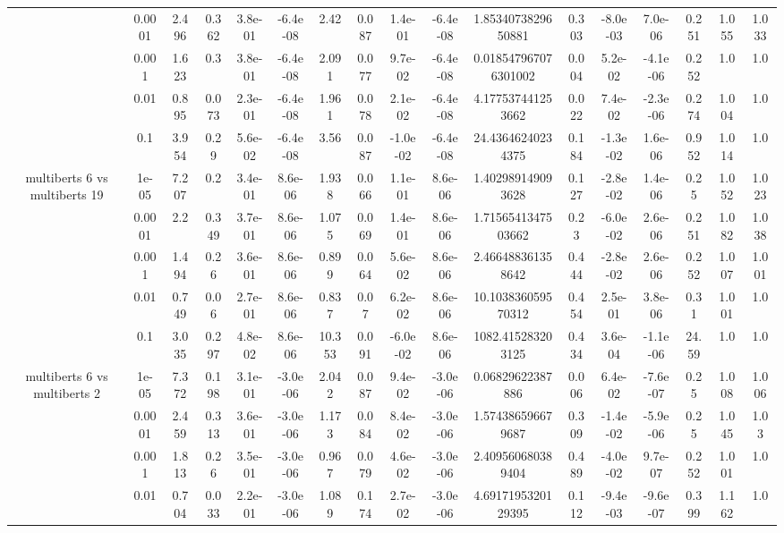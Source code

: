 \begin{tabular}{|c|c|c|c|c|c|c|c|c|c|c|c|c|c|c|c|c|}
 & 0.0001 & 2.496 & 0.362 & 3.8e-01 & -6.4e-08 & 2.42 & 0.087 & 1.4e-01 & -6.4e-08 & 1.8534073829650881 & 0.303 & -8.0e-03 & 7.0e-06 & 0.251 & 1.055 & 1.033 \\
 & 0.001 & 1.623 & 0.3 & 3.8e-01 & -6.4e-08 & 2.091 & 0.077 & 9.7e-02 & -6.4e-08 & 0.018547967076301002 & 0.004 & 5.2e-02 & -4.1e-06 & 0.252 & 1.0 & 1.0 \\
 & 0.01 & 0.895 & 0.073 & 2.3e-01 & -6.4e-08 & 1.961 & 0.078 & 2.1e-02 & -6.4e-08 & 4.177537441253662 & 0.022 & 7.4e-02 & -2.3e-06 & 0.274 & 1.004 & 1.0 \\
 & 0.1 & 3.954 & 0.29 & 5.6e-02 & -6.4e-08 & 3.56 & 0.087 & -1.0e-02 & -6.4e-08 & 24.43646240234375 & 0.184 & -1.3e-02 & 1.6e-06 & 0.952 & 1.014 & 1.0 \\
\hline
\multirow{5}{*}{multiberts 6 vs multiberts 19} & 1e-05 & 7.207 & 0.2 & 3.4e-01 & 8.6e-06 & 1.938 & 0.066 & 1.1e-01 & 8.6e-06 & 1.402989149093628 & 0.127 & -2.8e-02 & 1.4e-06 & 0.25 & 1.052 & 1.023 \\
 & 0.0001 & 2.2 & 0.349 & 3.7e-01 & 8.6e-06 & 1.075 & 0.069 & 1.4e-01 & 8.6e-06 & 1.7156541347503662 & 0.23 & -6.0e-02 & 2.6e-06 & 0.251 & 1.082 & 1.038 \\
 & 0.001 & 1.494 & 0.26 & 3.6e-01 & 8.6e-06 & 0.899 & 0.064 & 5.6e-02 & 8.6e-06 & 2.466488361358642 & 0.444 & -2.8e-02 & 2.6e-06 & 0.252 & 1.007 & 1.001 \\
 & 0.01 & 0.749 & 0.06 & 2.7e-01 & 8.6e-06 & 0.837 & 0.07 & 6.2e-02 & 8.6e-06 & 10.103836059570312 & 0.454 & 2.5e-01 & 3.8e-06 & 0.31 & 1.001 & 1.0 \\
 & 0.1 & 3.035 & 0.297 & 4.8e-02 & 8.6e-06 & 10.353 & 0.091 & -6.0e-02 & 8.6e-06 & 1082.415283203125 & 0.434 & 3.6e-04 & -1.1e-06 & 24.59 & 1.0 & 1.0 \\
\hline
\multirow{5}{*}{multiberts 6 vs multiberts 2} & 1e-05 & 7.372 & 0.198 & 3.1e-01 & -3.0e-06 & 2.042 & 0.087 & 9.4e-02 & -3.0e-06 & 0.06829622387886 & 0.006 & 6.4e-02 & -7.6e-07 & 0.25 & 1.008 & 1.006 \\
 & 0.0001 & 2.459 & 0.313 & 3.6e-01 & -3.0e-06 & 1.173 & 0.084 & 8.4e-02 & -3.0e-06 & 1.574386596679687 & 0.309 & -1.4e-02 & -5.9e-06 & 0.25 & 1.045 & 1.03 \\
 & 0.001 & 1.813 & 0.26 & 3.5e-01 & -3.0e-06 & 0.967 & 0.079 & 4.6e-02 & -3.0e-06 & 2.409560680389404 & 0.489 & -4.0e-02 & 9.7e-07 & 0.252 & 1.001 & 1.0 \\
 & 0.01 & 0.704 & 0.033 & 2.2e-01 & -3.0e-06 & 1.089 & 0.174 & 2.7e-02 & -3.0e-06 & 4.6917195320129395 & 0.112 & -9.4e-03 & -9.6e-07 & 0.399 & 1.162 & 1.0 \\

\end{tabular}

